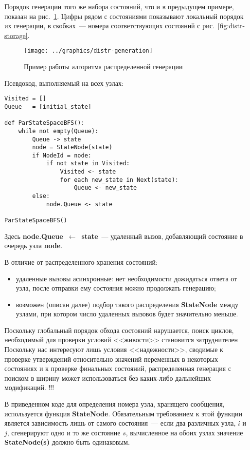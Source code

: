 \documentclass[12pt,a4paper,fleqn]{article}
\newcommand{\Code}[1]{\textbf{\mbox{#1}}}
\begin{document}
Порядок генерации того же набора состояний, что и в предыдущем примере, показан на
рис.~\ref{fig:distr-generation}. Цифры рядом с состояниями показывают локальный порядок их
генерации, в скобках~--- номера соответствующих состояний с рис.~\ref{fig:distr-storage}.

\begin{figure}[!htb]
  \centering
  \texttt{[image: ../graphics/distr-generation]}
  \caption{Пример работы алгоритма распределенной генерации}
  \label{fig:distr-generation}
\end{figure}

Псевдокод, выполняемый на всех узлах:

\begin{lstlisting}[style=pseudocode]
Visited = []
Queue   = [initial_state]

def ParStateSpaceBFS():
    while not empty(Queue):
        Queue -> state
        node = StateNode(state)
        if NodeId = node:
            if not state in Visited:
                Visited <- state
                for each new_state in Next(state):
                    Queue <- new_state
        else:
            node.Queue <- state

ParStateSpaceBFS()
\end{lstlisting}

Здесь \Code{node.Queue $\leftarrow$ state}~--- удаленный вызов, добавляющий состояние в очередь узла
\Code{node}.

В отличие от распределенного хранения состояний:
\begin{itemize}
\item удаленные вызовы асинхронные: нет необходимости дожидаться ответа от узла, после
  отправки ему состояния можно продолжать генерацию;
\item возможен (описан далее) подбор такого распределения \Code{StateNode} между узлами,
  при котором число удаленных вызовов будет значительно меньше.
\end{itemize}

Поскольку глобальный порядок обхода состояний нарушается, поиск циклов, необходимый для проверки
условий <<живости>> становится затруднителен Поскольку нас интересуют лишь условия <<надежности>>,
сводимые к проверке утверждений относительно значений переменных в некоторых состояниях и к проверке
финальных состояний, распределенная генерация с поиском в ширину может использоваться без каких-либо
дальнейших модификаций.
!!!

В приведенном коде для определения номера узла, хранящего сообщения, используется функция
\Code{StateNode}. Обязательным требованием к этой функции является зависимость лишь от
самого состояния~--- если два различных узла, $i$ и $j$, сгенерируют одно и то же состояние
$s$, вычисленное на обоих узлах значение \Code{StateNode(s)} должно быть одинаковым.
\end{document}
